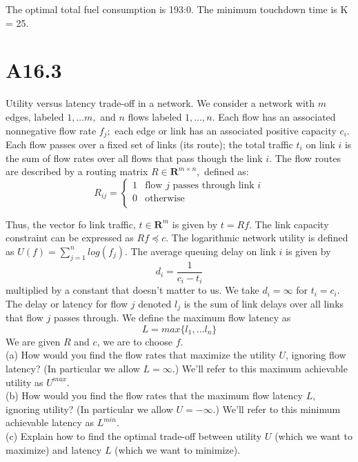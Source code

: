 \documentclass{article}
\begin{document}
The optimal total fuel consumption is 193:0. The minimum touchdown
time is K = 25.


\section*{A16.3}

Utility versus latency trade-off in a network. We consider a network with $m$ edges, labeled $1, \dots m,$ and $n$ flows labeled $1, \dots, n.$ Each flow has an associated nonnegative flow rate $f_j;$ each edge or link has an associated positive capacity $c_i.$ Each flow passes over a fixed set of links (its route); the total traffic
$t_i$ on link $i$ is the sum of flow rates over all flows that pass though the link $i.$ The flow routes are described by a routing matrix 
$R \in \boldsymbol{R}^{m\times n},$ defined as:
$$
R_{ij} = 
\begin{cases}
	1 & \text{flow } j \text{ passes through link } i\\
	0 & \text{otherwise}\\
\end{cases}
$$

Thus, the vector fo link traffic, $t \in \boldsymbol{R}^m$ is given by $t = Rf.$ 
The link capacity constraint can be expressed as $Rf \preceq c.$ The logarithmic network utility is defined as $U(f) = \sum_{j = 1}^{n} log(f_j).$ The average queuing delay on link $i$ is given by 
$$
d_i = \frac{1}{c_i - t_i}
$$
multiplied by a constant that doesn't matter to us. We take $d_i = \infty$ for 
$t_i = c_i.$ The delay or latency for flow $j$ denoted $l_j$ is the sum of link delays
over all links that flow $j$ passes through. We define the maximum flow latency as
$$
L = max\{l_1, \dots l_n\}
$$
We are given $R$ and $c$, we are to choose $f.$\\

(a) How would you find the flow rates that maximize the utility $U$, ignoring 
flow latency? (In particular we allow $L = \infty.$) We'll refer to this maximum achievable utility as $U^{max}.$\\

(b) How would you find the flow rates that the maximum flow latency $L,$ ignoring utility? (In particular we allow $U = -\infty.$) We'll refer to this minimum achievable latency as $L^{min}.$ \\

(c) Explain how to find the optimal trade-off between utility $U$ (which we want to maximize) and latency $L$ (which we want to minimize). \\
\end{document}
